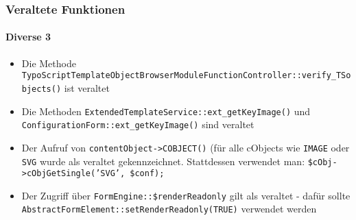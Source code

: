 \begin{frame}[fragile]
	\frametitle{Veraltete Funktionen}
	\framesubtitle{Diverse 3}

	\begin{itemize}
		\item Die Methode \texttt{TypoScriptTemplateObjectBrowserModuleFunctionController::verify\_TSobjects()} ist veraltet
 		\item Die Methoden \texttt{ExtendedTemplateService::ext\_getKeyImage()} und \texttt{ConfigurationForm::ext\_getKeyImage()} sind veraltet
 		\item Der Aufruf von \texttt{contentObject->COBJECT()} (für alle cObjects wie \texttt{IMAGE} oder \texttt{SVG} wurde als veraltet gekennzeichnet. Stattdessen verwendet man: \texttt{\$cObj->cObjGetSingle('SVG', \$conf);}
 		\item Der Zugriff über \texttt{FormEngine::\$renderReadonly} gilt als veraltet - dafür sollte \texttt{AbstractFormElement::setRenderReadonly(TRUE)} verwendet werden

	\end{itemize}

\end{frame}


